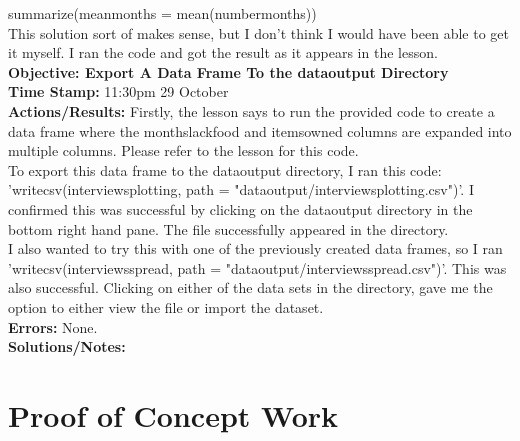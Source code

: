 \documentclass{article}
\begin{document}
\begin{FlushLeft}
summarize(mean\textunderscore months = mean(number\textunderscore months))\\
This solution sort of makes sense, but I don't think I would have been able to get it myself. I ran the code and got the result as it appears in the lesson.\\
\vspace{5mm}
\textbf{Objective: Export A Data Frame To the data\textunderscore output Directory}\\ 
\textbf{Time Stamp:} 11:30pm 29 October\\
\textbf{Actions/Results:} Firstly, the lesson says to run the provided code to create a data frame where the months\textunderscore lack\textunderscore food and items\textunderscore owned columns are expanded into multiple columns. Please refer to the lesson for this code.\\
To export this data frame to the data\textunderscore output directory, I ran this code: 'write\textunderscore csv(interviews\textunderscore plotting, path = "data\textunderscore output/interviews\textunderscore plotting.csv")'.
I confirmed this was successful by clicking on the  data\textunderscore output directory in the bottom right hand pane. The file successfully appeared in the directory.\\
I also wanted to try this with one of the previously created data frames, so I ran 'write\textunderscore csv(interviews\textunderscore spread, path = "data\textunderscore output/interviews\textunderscore spread.csv")'. This was also successful. Clicking on either of the data sets in the directory, gave me the option to either view the file or import the dataset.\\
\textbf{Errors:} None.\\
\textbf{Solutions/Notes:}\\

\pagebreak

\section{Proof of Concept Work}


\end{FlushLeft}
\end{document}
